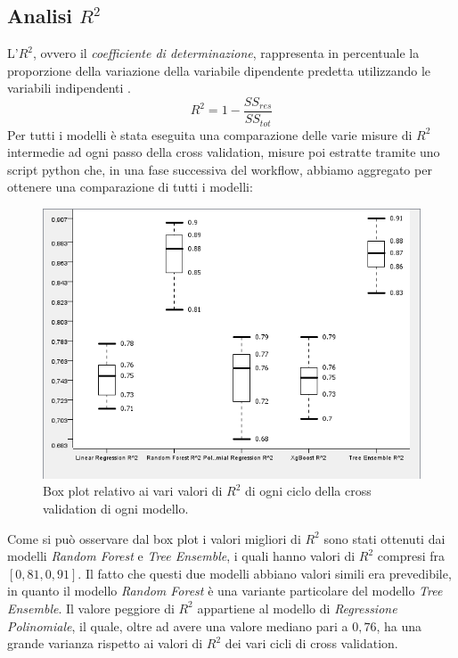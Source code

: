 \documentclass[12pt, a4paper, twocolumn]{article} %
\begin{document}
\subsection{Analisi $R^{2}$}
L'$R^{2}$, ovvero il \textit{coefficiente di determinazione}, rappresenta in percentuale la proporzione della variazione della variabile dipendente predetta utilizzando le variabili indipendenti \cite{r2}.\[R^{2} = 1 - \frac{SS_{res}}{SS_{tot}}\]
Per tutti i modelli è stata eseguita una comparazione delle varie misure di $R^{2}$ intermedie ad ogni passo della cross validation, misure poi estratte tramite uno script python che, in una fase successiva del workflow, abbiamo  aggregato per ottenere una comparazione di tutti i modelli:
\begin{figure}[H]
  \includegraphics[scale=0.5]{./Immagini/boxplot-r2.png}
  \caption{Box plot relativo ai vari valori di $R^{2}$ di ogni ciclo della cross validation di ogni modello.}
\end{figure}
Come si può osservare dal box plot i valori migliori di $R^{2}$ sono stati ottenuti dai modelli \textit{Random Forest} e \textit{Tree Ensemble}, i quali hanno valori di $R^{2}$ compresi fra $[0,81, 0,91]$. Il fatto che questi due modelli abbiano valori simili era prevedibile, in quanto il modello \textit{Random Forest} è una variante particolare del modello \textit{Tree Ensemble}. Il valore peggiore di $R^{2}$ appartiene al modello di \textit{Regressione Polinomiale}, il quale, oltre ad avere una valore mediano pari a $0,76$, ha una grande varianza rispetto ai valori di $R^{2}$ dei vari cicli di cross validation. 
\end{document}
